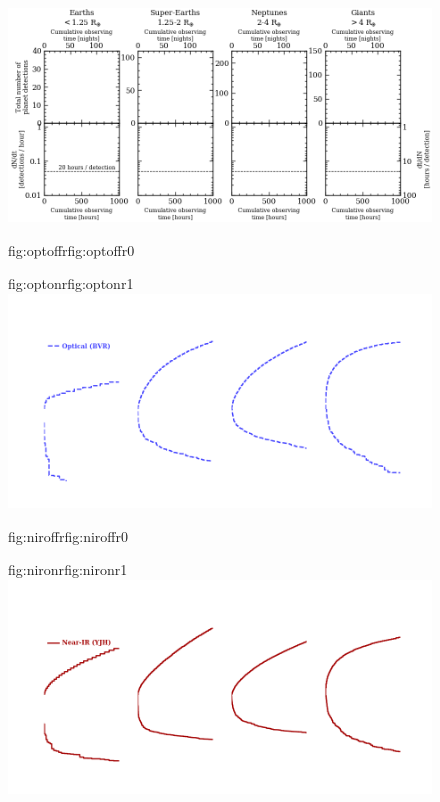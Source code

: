 \begin{figure}
  \centering
  \includegraphics[width=\hsize]{figures/cumulativetobsGP_rp_bkgd.png}%
  \hspace{-\hsize}%
  \begin{ocg}{fig:optoffr}{fig:optoffr}{0}%
  \end{ocg}%
  \begin{ocg}{fig:optonr}{fig:optonr}{1}%
  \includegraphics[width=\hsize]{figures/cumulativetobsGP_rp_opt.png}%
  \end{ocg}
  \hspace{-\hsize}%
  \begin{ocg}{fig:niroffr}{fig:niroffr}{0}%
  \end{ocg}%
  \begin{ocg}{fig:nironr}{fig:nironr}{1}%
  \includegraphics[width=\hsize]{figures/cumulativetobsGP_rp_nir.png}%

\end{ocg}
\end{figure}
